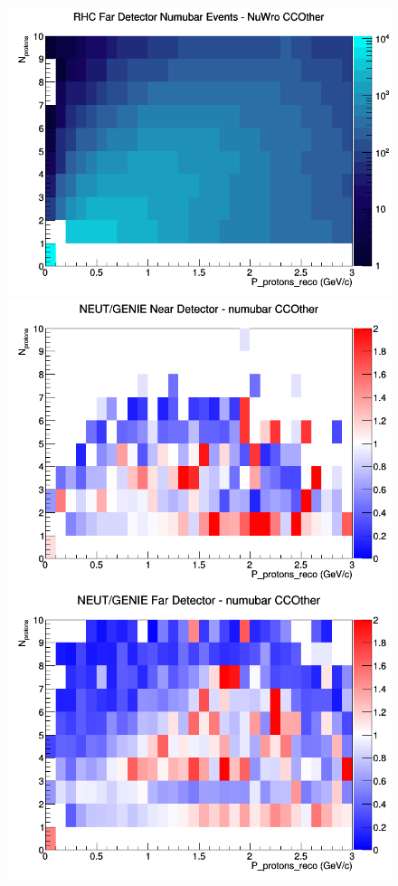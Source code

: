 \begin{figure}[h]
\endminipage
{}
\includegraphics[width=\linewidth]{eff_N_P/FGT/protons/CCOther_RHC_FD_numubar_N_P_NuWro.png}
\endminipage
\newline
{}
\includegraphics[width=\linewidth]{eff_N_P/FGT/protons/ratios/CCOther_NEUT_GENIE_numubar_near_N_P.png}
\endminipage
{}
\includegraphics[width=\linewidth]{eff_N_P/FGT/protons/ratios/CCOther_NEUT_GENIE_numubar_far_N_P.png}

\end{figure}
